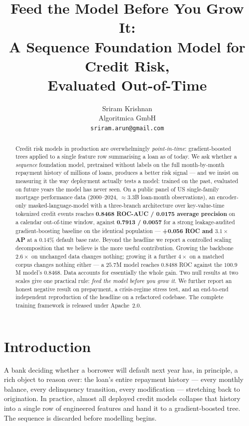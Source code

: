 \documentclass[10pt,letterpaper]{article}
\title{\textbf{Feed the Model Before You Grow It:\\
A Sequence Foundation Model for Credit Risk,\\
Evaluated Out-of-Time}}
\author{%
  Sriram Krishnan \\
  \normalsize Algoritmica GmbH \\
  \normalsize \texttt{sriram.arun@gmail.com}
}
\date{}
\begin{document}
\maketitle

\begin{abstract}
Credit risk models in production are overwhelmingly \emph{point-in-time}: gradient-boosted trees
applied to a single feature row summarising a loan as of today. We ask whether a \emph{sequence}
foundation model, pretrained without labels on the full month-by-month repayment history of
millions of loans, produces a better risk signal --- and we insist on measuring it the way
deployment actually tests a model: trained on the past, evaluated on future years the model has
never seen. On a public panel of US single-family mortgage performance data (2000--2024,
$\approx$3.3B loan-month observations), an encoder-only masked-language-model with a three-branch
architecture over key-value-time tokenized credit events reaches \textbf{0.8468 ROC-AUC / 0.0175
average precision} on a calendar out-of-time window, against \textbf{0.7913 / 0.0057} for a
strong leakage-audited gradient-boosting baseline on the identical population --- \textbf{+0.056
ROC and $3.1\times$ AP} at a $0.14\%$ default base rate. Beyond the headline we report a
controlled scaling decomposition that we believe is the more useful contribution. Growing the
backbone $2.6\times$ on unchanged data changes nothing; growing it a further $4\times$ on a
matched corpus changes nothing either --- a $25.7$M model reaches $0.8488$ ROC against the $100.9$M
model's $0.8468$. Data accounts for essentially the whole gain. Two null results at two scales give
one practical rule: \emph{feed the model before you grow it}. We further report an honest negative result on
prepayment, a crisis-regime stress test, and an end-to-end independent reproduction of the
headline on a refactored codebase. The complete training framework is released under Apache~2.0.
\end{abstract}

\section{Introduction}
\label{sec:intro}

A bank deciding whether a borrower will default next year has, in principle, a rich object to
reason over: the loan's entire repayment history --- every monthly balance, every delinquency
transition, every modification --- stretching back to origination. In practice, almost all
deployed credit models collapse that history into a single row of engineered features and hand it
to a gradient-boosted tree. The sequence is discarded before modelling begins.
\end{document}
